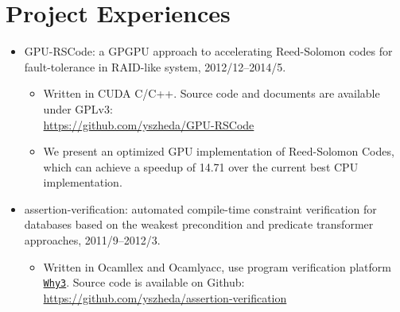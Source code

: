 \documentclass[letterpaper]{article}
\begin{document}
\section*{Project Experiences}
\begin{itemize}
    \item GPU-RSCode: a GPGPU approach to accelerating Reed-Solomon codes for fault-tolerance in RAID-like system, 2012/12--2014/5.
        \begin{itemize}
            \item Written in CUDA C/C++. Source code and documents are available under GPLv3: \\ \url{https://github.com/yszheda/GPU-RSCode}
            \item We present an optimized GPU implementation of Reed-Solomon Codes, which can achieve a speedup of 14.71 over the current best CPU implementation.
        \end{itemize}
    \item assertion-verification: automated compile-time constraint verification for databases based on the weakest precondition and predicate transformer approaches, 2011/9--2012/3.
        \begin{itemize}
            \item Written in Ocamllex and Ocamlyacc, use program verification platform \href{http://why3.lri.fr/}{\tt Why3}. Source code is available on Github: \\ \url{https://github.com/yszheda/assertion-verification}
        \end{itemize}

\end{itemize}
\end{document}
